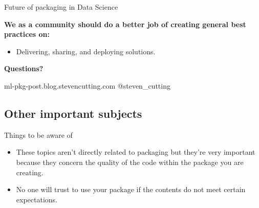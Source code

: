 \documentclass[10pt]{beamer}
\begin{document}
\begin{frame}[fragile]{Future of packaging in Data Science}

  \textbf{We as a community should do a better job of creating general best practices on:}
  \begin{itemize}
    \item Delivering, sharing, and deploying solutions.
  \end{itemize}
  
\end{frame}




  




\begin{frame}[standout]

  \textbf{Questions?}

  ml-pkg-post.blog.stevencutting.com
  @steven\_cutting
  
\end{frame}





\appendix



\subsection{Other important subjects}

\begin{frame}[fragile]{Things to be aware of}

  \begin{itemize}
    \item These topics aren't directly related to packaging but they're very important because they concern the quality of the code within the package you are creating.
    \item No one will trust to use your package if the contents do not meet certain expectations.
   \end{itemize}

\end{frame}
\end{document}
